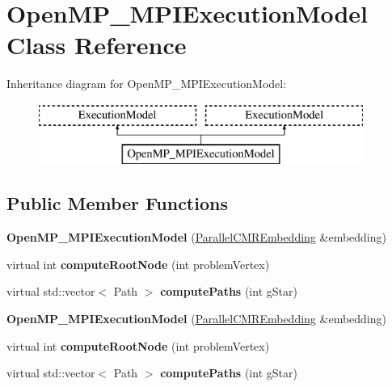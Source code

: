 \hypertarget{a00090}{}\section{Open\+M\+P\+\_\+\+M\+P\+I\+Execution\+Model Class Reference}
\label{a00090}
Inheritance diagram for Open\+M\+P\+\_\+\+M\+P\+I\+Execution\+Model\+:\begin{figure}[H]
\begin{center}
\leavevmode
\includegraphics[height=2.000000cm]{a00090}
\end{center}
\end{figure}
\subsection*{Public Member Functions}
\begin{DoxyCompactItemize}
\item 
{\bfseries Open\+M\+P\+\_\+\+M\+P\+I\+Execution\+Model} (\hyperlink{a00092}{Parallel\+C\+M\+R\+Embedding} \&embedding)\hypertarget{a00090_a6026a68ba49eb929784ac116c6581c34}{}\label{a00090_a6026a68ba49eb929784ac116c6581c34}

\item 
virtual int {\bfseries compute\+Root\+Node} (int problem\+Vertex)\hypertarget{a00090_a5ab98063e4c317de38062314b9927492}{}\label{a00090_a5ab98063e4c317de38062314b9927492}

\item 
virtual std\+::vector$<$ Path $>$ {\bfseries compute\+Paths} (int g\+Star)\hypertarget{a00090_aa673c61e71fa3246a79ee5ce41be01b8}{}\label{a00090_aa673c61e71fa3246a79ee5ce41be01b8}

\item 
{\bfseries Open\+M\+P\+\_\+\+M\+P\+I\+Execution\+Model} (\hyperlink{a00092}{Parallel\+C\+M\+R\+Embedding} \&embedding)\hypertarget{a00090_a6026a68ba49eb929784ac116c6581c34}{}\label{a00090_a6026a68ba49eb929784ac116c6581c34}

\item 
virtual int {\bfseries compute\+Root\+Node} (int problem\+Vertex)\hypertarget{a00090_a552757725618db3523e5c7d583eafcba}{}\label{a00090_a552757725618db3523e5c7d583eafcba}

\item 
virtual std\+::vector$<$ Path $>$ {\bfseries compute\+Paths} (int g\+Star)\hypertarget{a00090_a7febfa9f71cbabbb18e76489a051e54a}{}\label{a00090_a7febfa9f71cbabbb18e76489a051e54a}

\end{DoxyCompactItemize}
